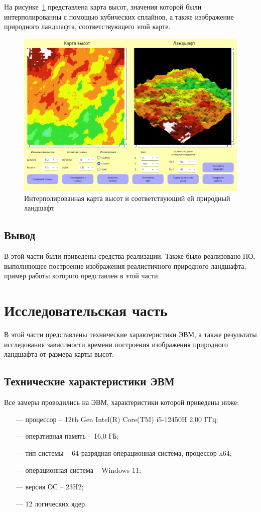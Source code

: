 \documentclass[a4paper, 14pt]{extreport}
\begin{document}
На рисунке~\ref{pict:ex3} представлена карта высот, значения которой были интерполированны с помощью кубических 
сплайнов, а также изображение природного ландшафта, соответствующего этой карте.
\clearpage\begin{figure}[h]
	\centering
	\includegraphics[scale=0.55]{tools/ex3.png}
	\caption{Интерполированная карта высот и соответствующий ей природный ландшафт}
	\label{pict:ex3}
\end{figure}

\section{Вывод}

В этой части были приведены средства реализации. Также было реализовано ПО, выполняющее построение изображения 
реалистичного природного ландшафта, пример работы которого представлен в этой части. 

\chapter{Исследовательская часть}

В этой части представлены технические характеристики ЭВМ, а также результаты исследования зависимости времени 
построения изображения природного ландшафта от размера карты высот.

\section{Технические характеристики ЭВМ}

Все замеры проводились на ЭВМ, характеристики которой приведены ниже:
\begin{itemize}
	\item[---] процессор -- 12th Gen Intel(R) Core(TM) i5-12450H   2.00 ГГц;
	\item[---] оперативная память -- 16,0 ГБ;
	\item[---] тип системы -- 64-разрядная операционная система, процессор x64;
	\item[---] операционная система -- Windows 11;
	\item[---] версия ОС -- 23H2;
	\item[---] 12 логических ядер.
\end{itemize}
\end{document}
